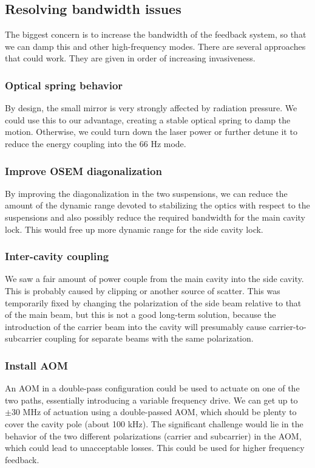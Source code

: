 \subsection{Resolving bandwidth issues}
\label{sec:bandwidth}

The biggest concern is to increase the bandwidth of the feedback system, so that we can damp this and other high-frequency modes. There are several approaches that could work. They are given in order of increasing invasiveness.

\subsubsection{Optical spring behavior}

By design, the small mirror is very strongly affected by radiation pressure. We could use this to our advantage, creating a stable optical spring to damp the motion. Otherwise, we could turn down the laser power or further detune it to reduce the energy coupling into the 66 Hz mode.




\subsubsection{Improve OSEM diagonalization}
By improving the diagonalization in the two suspensions, we can reduce the amount of the dynamic range devoted to stabilizing the optics with respect to the suspensions and also possibly reduce the required bandwidth for the main cavity lock. This would free up more dynamic range for the side cavity lock.

\subsubsection{Inter-cavity coupling}
We saw a fair amount of power couple from the main cavity into the side cavity. This is probably caused by clipping or another source of scatter. This was temporarily fixed by changing the polarization of the side beam relative to that of the main beam, but this is not a good long-term solution, because the introduction of the carrier beam into the cavity will presumably cause carrier-to-subcarrier coupling for separate beams with the same polarization.

\subsubsection{Install AOM}
An AOM in a double-pass configuration could be used to actuate on one of the two paths, essentially introducing a variable frequency drive. 
We can get up to $\pm30$ MHz of actuation using a double-passed AOM, which should be plenty to cover the cavity pole (about 100 kHz). The significant challenge would lie in the behavior of the two different polarizations (carrier and subcarrier) in the AOM, which could lead to unacceptable losses.
This could be used for higher frequency feedback.

